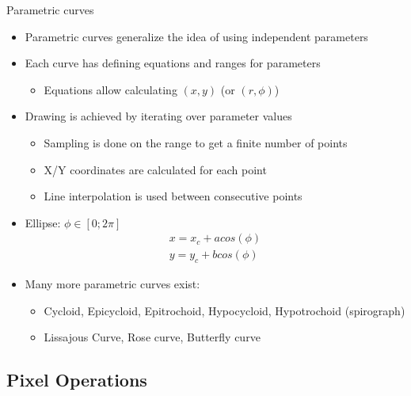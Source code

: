 \begin{frame}{Parametric curves}
  \begin{itemize}
  \item Parametric curves generalize the idea of using independent parameters
  \item Each curve has defining equations and ranges for parameters
    \begin{itemize}
    \item Equations allow calculating \((x,y)\) (or \((r,\phi)\))
    \end{itemize}
  \item Drawing is achieved by iterating over parameter values
    \begin{itemize}
    \item Sampling is done on the range to get a finite number of points
    \item X/Y coordinates are calculated for each point
    \item Line interpolation is used between consecutive points
    \end{itemize}
  \item Ellipse: \(\phi \in [0;2\pi]\)
\begin{gather*}
x = x_c + a cos(\phi)\\
y = y_c + b cos(\phi)
\end{gather*}
  \item Many more parametric curves exist:
    \begin{itemize}
    \item Cycloid, Epicycloid, Epitrochoid, Hypocycloid, Hypotrochoid (spirograph)
    \item Lissajous Curve, Rose curve, Butterfly curve
    \end{itemize}
  \end{itemize}
\end{frame}

\subsection{Pixel Operations}


